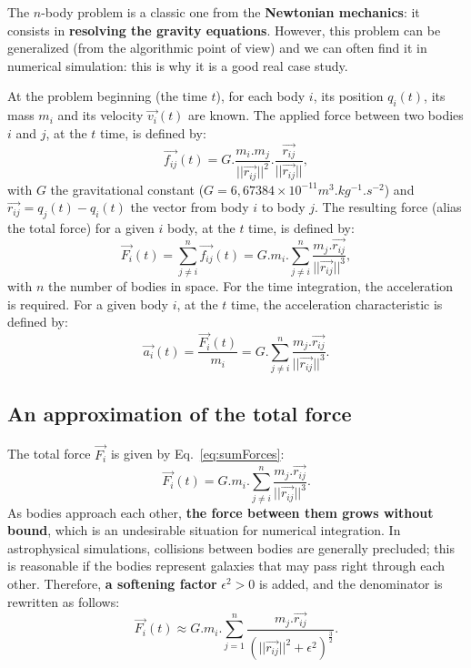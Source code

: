 The $n$-body problem is a classic one from the \textbf{Newtonian mechanics}: it consists in \textbf{resolving the gravity equations}.
However, this problem can be generalized (from the algorithmic point of view) and we can often find it in numerical simulation: this is why it is a good real case study.

At the problem beginning (the time $t$), for each body $i$, its position $q_{i}(t)$, its mass $m_i$ and its velocity $\vec{v_i}(t)$ are known.
The applied force between two bodies $i$ and $j$, at the $t$ time, is defined by:
\begin{equation}
\label{eq:force}
	\vec{f_{ij}}(t) = G.\frac{m_i.m_j}{||\vec{r_{ij}}||^2}.\frac{\vec{r_{ij}}}{||\vec{r_{ij}}||},
\end{equation}
with $G$ the gravitational constant ($G = 6,67384\times10^{-11} m^3.kg^{-1}.s^{-2}$) and $\vec{r_{ij}} = q_j(t) - q_i(t)$ the vector from body $i$ to body $j$.
The resulting force (alias the total force) for a given $i$ body, at the $t$ time, is defined by:
\begin{equation}
\label{eq:sumForces}
	\vec{F_i}(t) = \sum_{j \ne i}^{n} \vec{f_{ij}}(t) = G.m_i.\sum_{j \ne i}^{n}\frac{m_j.\vec{r_{ij}}}{||\vec{r_{ij}}||^3},
\end{equation}
with $n$ the number of bodies in space.
For the time integration, the acceleration is required. For a given body $i$, at the $t$ time, the acceleration characteristic is defined by:
\begin{equation}
\label{eq:acceleration}
	\vec{a_i}(t) = \frac{\vec{F_i}(t)}{m_i} = G.\sum_{j \ne i}^{n}\frac{m_j.\vec{r_{ij}}}{||\vec{r_{ij}}||^3}.
\end{equation}

\subsection{An approximation of the total force}

The total force $\vec{F_i}$ is given by Eq.~\ref{eq:sumForces}:
\begin{equation*}
	\vec{F_i}(t) = G.m_i.\sum_{j \ne i}^{n}\frac{m_j.\vec{r_{ij}}}{||\vec{r_{ij}}||^3}.
\end{equation*}
As bodies approach each other, \textbf{the force between them grows without bound}, which is an undesirable situation for numerical integration. 
In astrophysical simulations, collisions between bodies are generally precluded; this is reasonable if the bodies represent galaxies that may pass right through each other. 
Therefore, \textbf{a softening factor} $\epsilon^2 > 0$ is added, and the denominator is rewritten as follows:
\begin{equation}
\label{eq:sumForcesSoft}
	\vec{F_i}(t) \approx G.m_i.\sum_{j = 1}^{n}\frac{m_j.\vec{r_{ij}}}{(||\vec{r_{ij}}||^2 + \epsilon^2)^\frac{3}{2}}.
\end{equation}


